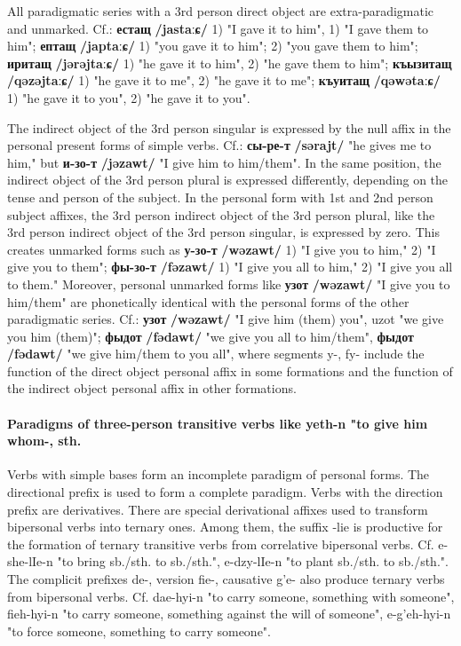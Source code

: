 \documentclass[a4paper,12pt]{book}
\newcommand{\1}[1]{\textbf{\emph{#1}}} %
\newcommand{\2}[1]{\textbf{[#1]}} %
\newcommand{\3}[1]{\fontsize{11pt}{0cm}\textbf{\emph{#1}}} %
\newcommand{\4}[1]{\fontsize{10pt}{0cm}\emph{#1}}	%
\newcommand{\5}[1]{\textbf{/#1/}} %
\newcommand{\6}[1]{\textbf{[#1]}} %
\newcommand{\7}[1]{\fontsize{12pt}{0cm}\emph{#1}} %
\newcommand{\8}[1]{\fontsize{12pt}{0cm}`#1'} %
\newcommand{\9}[1]{\fontsize{12pt}{0cm}(lit. `#1')} %
\newcommand{\glossphonemics}[1]{\textbf{/#1/}} %
\begin{document}
All paradigmatic series with a 3rd person direct object are extra-paradigmatic and unmarked. Cf.: \textbf{естащ} \glossphonemics{jastaːɕ} 1) "I gave it to him", 1) "I gave them to him"; \textbf{ептащ} \glossphonemics{japtaːɕ} 1) "you gave it to him"; 2) "you gave them to him"; \textbf{иритащ} \glossphonemics{jərəjtaːɕ} 1) "he gave it to him", 2) "he gave them to him"; \textbf{къызитащ} \glossphonemics{qəzəjtaːɕ} 1) "he gave it to me", 2) "he gave it to me"; \textbf{къуитащ} \glossphonemics{qəwətaːɕ} 1) "he gave it to you", 2) "he gave it to you".

The indirect object of the 3rd person singular is expressed by the null affix in the personal present forms of simple verbs. Cf.: \textbf{сы-ре-т} \glossphonemics{sərajt} "he gives me to him," but \textbf{и-зо-т} \glossphonemics{jəzawt} "I give him to him/them". In the same position, the indirect object of the 3rd person plural is expressed differently, depending on the tense and person of the subject. In the personal form with 1st and 2nd person subject affixes, the 3rd person indirect object of the 3rd person plural, like the 3rd person indirect object of the 3rd person singular, is expressed by zero. This creates unmarked forms such as \textbf{у-зо-т} \glossphonemics{wəzawt} 1) "I give you to him," 2) "I give you to them"; \textbf{фы-зо-т} \glossphonemics{fəzawt} 1) "I give you all to him," 2) "I give you all to them." Moreover, personal unmarked forms like \textbf{узот} \glossphonemics{wəzawt} "I give you to him/them" are phonetically identical with the personal forms of the other paradigmatic series. Cf.: \textbf{узот} \glossphonemics{wəzawt} "I give him (them) you", uzot "we give you him (them)"; \textbf{фыдот} \glossphonemics{fədawt} "we give you all to him/them", \textbf{фыдот} \glossphonemics{fədawt} "we give him/them to you all", where segments y-, fy- include the function of the direct object personal affix in some formations and the function of the indirect object personal affix in other formations.
\paragraph{Paradigms of three-person transitive verbs like yeth-n "to give him whom-, sth.}
Verbs with simple bases form an incomplete paradigm of personal forms. The directional prefix is used to form a complete paradigm. Verbs with the direction prefix are derivatives. There are special derivational affixes used to transform bipersonal verbs into ternary ones. Among them, the suffix -lie is productive for the formation of ternary transitive verbs from correlative bipersonal verbs. Cf. e-she-lIe-n "to bring sb./sth. to sb./sth.", e-dzy-lIe-n "to plant sb./sth. to sb./sth.". The complicit prefixes de-, version fie-, causative g'e- also produce ternary verbs from bipersonal verbs. Cf. dae-hyi-n "to carry someone, something with someone", fieh-hyi-n "to carry someone, something against the will of someone", e-g'eh-hyi-n "to force someone, something to carry someone".
\end{document}
